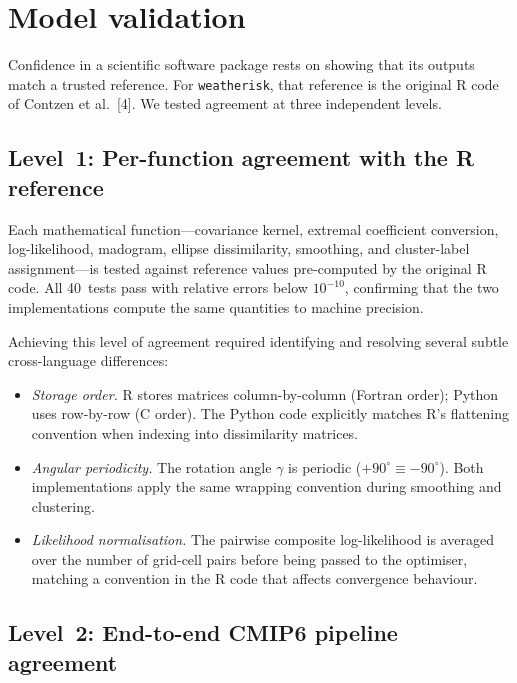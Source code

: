 \documentclass[preprint,12pt,a4paper]{elsarticle}
\newcommand{\rev}[1]{{#1}}
\begin{document}
\FloatBarrier


\rev{\section{Model validation}
\label{sec:validation}}

\rev{Confidence in a scientific software package rests on showing
that its outputs match a trusted reference. For
\texttt{weatherisk}, that reference is the original R code of
Contzen et al.~[4]. We tested agreement at three independent
levels.

\subsection{Level~1: Per-function agreement with the R reference}

Each mathematical function---covariance kernel, extremal
coefficient conversion, log-likelihood, madogram, ellipse
dissimilarity, smoothing, and cluster-label assignment---is
tested against reference values pre-computed by the original R
code. All 40~tests pass with relative errors below $10^{-10}$,
confirming that the two implementations compute the same
quantities to machine precision.

Achieving this level of agreement required identifying and
resolving several subtle cross-language differences:
\begin{itemize}
\item \emph{Storage order.} R stores matrices column-by-column
  (Fortran order); Python uses row-by-row (C order). The Python
  code explicitly matches R's flattening convention when indexing
  into dissimilarity matrices.
\item \emph{Angular periodicity.} The rotation angle $\gamma$ is
  periodic ($+90^{\circ} \equiv -90^{\circ}$). Both
  implementations apply the same wrapping convention during
  smoothing and clustering.
\item \emph{Likelihood normalisation.} The pairwise composite
  log-likelihood is averaged over the number of grid-cell pairs
  before being passed to the optimiser, matching a convention in
  the R code that affects convergence behaviour.
\end{itemize}

\subsection{Level~2: End-to-end CMIP6 pipeline agreement}

}
\end{document}
